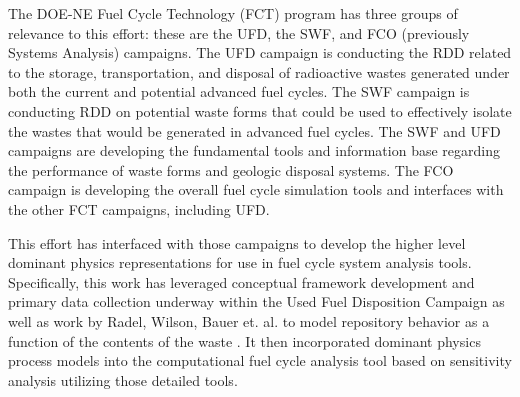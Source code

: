 
The DOE-NE Fuel Cycle Technology (FCT) program has three groups of relevance to 
this effort: these are the \gls{UFD}, the \gls{SWF}, and \gls{FCO} (previously 
Systems Analysis) campaigns.  
The \gls{UFD} campaign is conducting the \gls{RDD} related to the storage, 
transportation, and disposal of radioactive wastes generated under both the 
current and potential advanced fuel cycles.  The SWF campaign is conducting 
\gls{RDD} on potential waste forms that could be used to effectively isolate 
the 
wastes that would be generated in advanced fuel cycles.  The \gls{SWF} and
\gls{UFD} campaigns are developing the fundamental tools and information base 
regarding the performance of waste forms and geologic disposal systems.  The 
\gls{FCO} campaign is developing the overall fuel cycle simulation tools and 
interfaces with the other FCT campaigns, including \gls{UFD}.  

This effort has interfaced with those campaigns to develop the higher level
dominant physics representations for use in fuel cycle system analysis tools.
Specifically, this work has leveraged conceptual framework development and
primary data collection underway within the Used Fuel Disposition Campaign as
well as work by Radel, Wilson, Bauer et. al. to model repository behavior as a
function of the contents of the waste \cite{radel_effect_2007}.  It then 
incorporated dominant physics process models into the \Cyclus computational 
fuel cycle analysis tool \cite{wilson_cyclus:_2012} based on sensitivity analysis 
utilizing those detailed tools.
